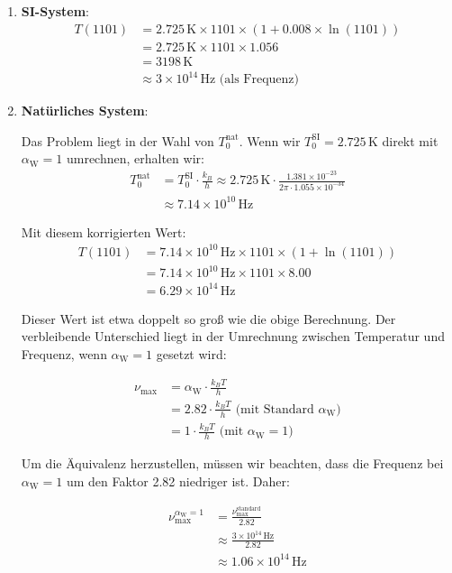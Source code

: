 \documentclass[12pt,a4paper]{article}
\newcommand{\alphaW}{\alpha_{\text{W}}}
\begin{document}
\begin{enumerate}
	\item \textbf{SI-System}:
	\begin{align}
		T(1101) &= 2.725 \, \text{K} \times 1101 \times (1 + 0.008 \times \ln(1101)) \\
		&= 2.725 \, \text{K} \times 1101 \times 1.056 \\
		&= 3198 \, \text{K} \\
		&\approx 3 \times 10^{14} \, \text{Hz} \text{ (als Frequenz)}
	\end{align}
	
	\item \textbf{Natürliches System}:
	
	Das Problem liegt in der Wahl von \(T_0^{\text{nat}}\). Wenn wir \(T_0^{\text{SI}} = 2.725 \, \text{K}\) direkt mit \(\alphaW = 1\) umrechnen, erhalten wir:
	\begin{align}
		T_0^{\text{nat}} &= T_0^{\text{SI}} \cdot \frac{k_B}{h} \approx 2.725 \, \text{K} \cdot \frac{1.381 \times 10^{-23}}{2\pi \cdot 1.055 \times 10^{-34}} \\
		&\approx 7.14 \times 10^{10} \, \text{Hz}
	\end{align}
	
	Mit diesem korrigierten Wert:
	\begin{align}
		T(1101) &= 7.14 \times 10^{10} \, \text{Hz} \times 1101 \times (1 + \ln(1101)) \\
		&= 7.14 \times 10^{10} \, \text{Hz} \times 1101 \times 8.00 \\
		&= 6.29 \times 10^{14} \, \text{Hz}
	\end{align}
	
	Dieser Wert ist etwa doppelt so groß wie die obige Berechnung. Der verbleibende Unterschied liegt in der Umrechnung zwischen Temperatur und Frequenz, wenn \(\alphaW = 1\) gesetzt wird:
	
	\begin{align}
		\nu_{\text{max}} &= \alphaW \cdot \frac{k_B T}{h} \\
		&= 2.82 \cdot \frac{k_B T}{h} \text{ (mit Standard \(\alphaW\))} \\
		&= 1 \cdot \frac{k_B T}{h} \text{ (mit \(\alphaW = 1\))}
	\end{align}
	
	Um die Äquivalenz herzustellen, müssen wir beachten, dass die Frequenz bei \(\alphaW = 1\) um den Faktor 2.82 niedriger ist. Daher:
	
	\begin{align}
		\nu_{\text{max}}^{\alphaW = 1} &= \frac{\nu_{\text{max}}^{\text{standard}}}{2.82} \\
		&\approx \frac{3 \times 10^{14} \, \text{Hz}}{2.82} \\
		&\approx 1.06 \times 10^{14} \, \text{Hz}
	\end{align}
	

\end{enumerate}
\end{document}
